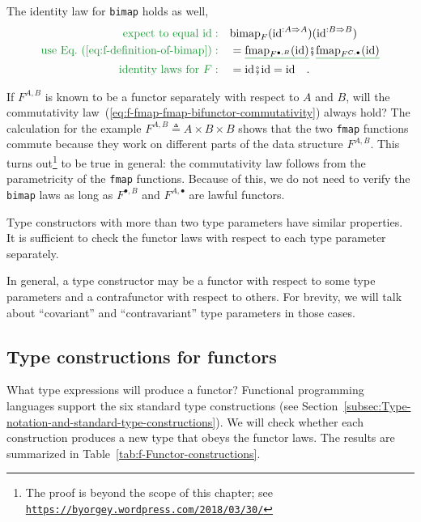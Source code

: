 The identity law for \lstinline!bimap! holds as well,
\begin{align*}
{\color{greenunder}\text{expect to equal }\text{id}:}\quad & \text{bimap}_{F}(\text{id}^{:A\Rightarrow A})(\text{id}^{:B\Rightarrow B})\\
{\color{greenunder}\text{use Eq.~(\ref{eq:f-definition-of-bimap})}:}\quad & =\gunderline{\text{fmap}_{F^{\bullet,B}}(\text{id})}\bef\gunderline{\text{fmap}_{F^{C,\bullet}}(\text{id})}\\
{\color{greenunder}\text{identity laws for }F:}\quad & =\text{id}\bef\text{id}=\text{id}\quad.
\end{align*}

If $F^{A,B}$ is known to be a functor separately with respect to
$A$ and $B$, will the commutativity law~(\ref{eq:f-fmap-fmap-bifunctor-commutativity})
always hold? The calculation for the example $F^{A,B}\triangleq A\times B\times B$
shows that the two \lstinline!fmap! functions commute because they
work on different parts of the data structure $F^{A,B}$. This turns
out\footnote{The proof is beyond the scope of this chapter; see \texttt{\href{https://byorgey.wordpress.com/2018/03/30/}{https://byorgey.wordpress.com/2018/03/30/}}}
to be true in general: the commutativity law follows from the parametricity
of the \lstinline!fmap! functions. Because of this, we do not need
to verify the \lstinline!bimap! laws as long as $F^{\bullet,B}$
and $F^{A,\bullet}$ are lawful functors.

Type constructors with more than two type parameters have similar
properties. It is sufficient to check the functor laws with respect
to each type parameter separately.

In general, a type constructor may be a functor with respect to some
type parameters and a contrafunctor with respect to others. For brevity,
we will talk about ``covariant'' and ``contravariant'' type parameters
in those cases.

\subsection{Type constructions for functors\label{subsec:f-Functor-constructions}}

What type expressions will produce a functor? Functional programming
languages support the six standard type constructions (see Section~\ref{subsec:Type-notation-and-standard-type-constructions}).
We will check whether each construction produces a new type that obeys
the functor laws. The results are summarized in Table~\ref{tab:f-Functor-constructions}.

